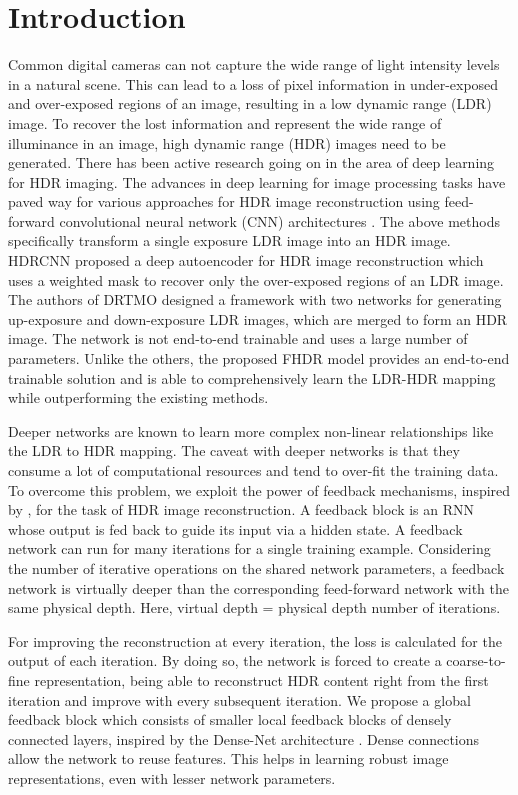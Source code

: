 \documentclass[conference]{IEEEtran}
\begin{document}
\section{Introduction}
Common digital cameras can not capture the wide range of light intensity levels in a natural scene.
This can lead to a loss of pixel information in under-exposed and over-exposed regions of an image, resulting in a low dynamic range (LDR) image. To recover the lost information and represent the wide range of illuminance in an image, high dynamic range (HDR) images need to be generated. There has been active research going on in the area of deep learning for HDR imaging. The advances in deep learning for image processing tasks have paved way for various approaches for HDR image reconstruction using feed-forward convolutional neural network (CNN) architectures \cite{eilertsen2017hdr}\cite{marnerides2018expandnet}\cite{endo2017deep}\cite{yang2018image}\cite{lee2018deep}. The above methods specifically transform a single exposure LDR image into an HDR image. 
HDRCNN \cite{eilertsen2017hdr} proposed a deep autoencoder for HDR image reconstruction which uses a weighted mask to recover only the over-exposed regions of an LDR image. The authors of DRTMO \cite{endo2017deep} designed a framework with two networks for generating up-exposure and down-exposure LDR images, which are merged to form an HDR image. The network is not end-to-end trainable and uses a large number of parameters. Unlike the others, the proposed FHDR model provides an end-to-end trainable solution and is able to comprehensively learn the LDR-HDR mapping while outperforming the existing methods.

Deeper networks are known to learn more complex non-linear relationships like the LDR to HDR mapping. The caveat with deeper networks is that they consume a lot of computational resources and tend to over-fit the training data. To overcome this problem, we 
exploit the power of feedback mechanisms, inspired by \cite{zamir2017feedback}, for the task of HDR image reconstruction. A feedback block is an RNN whose output is fed back to guide its input via a hidden state.
A feedback network can run for many iterations for a single training example. Considering the number of iterative operations on the shared network parameters, a feedback network is virtually deeper than the corresponding feed-forward network with the same physical depth. Here, virtual depth = physical depth  number of iterations.


For improving the reconstruction at every iteration, the loss is calculated for the output of each iteration.
By doing so, the network is forced to create a coarse-to-fine representation, being able to reconstruct HDR content right from the first iteration and improve with every subsequent iteration.
We propose a global feedback block which consists of smaller local feedback blocks of densely connected layers, inspired by the Dense-Net architecture \cite{huang2017densely}. Dense connections allow the network to reuse features. This helps in learning robust image representations, even with lesser network parameters. 
\end{document}
